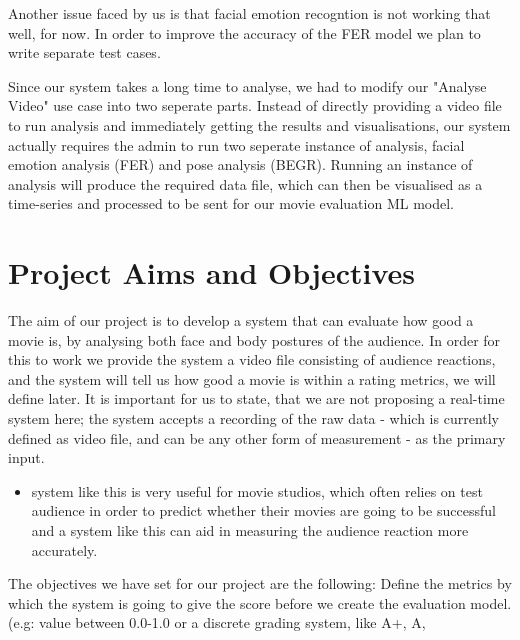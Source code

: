 \documentclass[12pt,a4paper,man]{report}
\begin{document}
Another issue faced by us is that facial emotion recogntion is not working that well, for now. In order to improve the accuracy of the \gls{FER} model we plan to write separate test cases.

Since our system takes a long time to analyse, we had to modify our "Analyse Video" use case into two seperate parts. Instead of directly providing a video file to run analysis and immediately getting the results and visualisations, our system actually requires the admin to run two seperate instance of analysis, facial emotion analysis (FER) and pose analysis (BEGR). Running an instance of analysis will produce the required data file, which can then be visualised as a time-series and processed to be sent for our movie evaluation ML model.


\chapter{Project Aims and Objectives}
\label{sec:org922e328}
The aim of our project is to develop a system that can evaluate how good a movie is, by analysing both face and body postures of the audience. In order for this to work we provide the system a video file consisting of audience reactions, and the system will tell us how good a movie is within a rating metrics, we will define later. It is important for us to state, that we are not proposing a real-time system here; the system accepts a recording of the raw data - which is currently defined as video file, and can be any other form of measurement - as the primary input.
\begin{itemize}
\item system like this is very useful for movie studios, which often relies on test audience in order to predict whether their movies are going to be successful and a system like this can aid in measuring the audience reaction more accurately.
\end{itemize}
The objectives we have set for our project are the following:
Define the metrics by which the system is going to give the score before we create the evaluation model. (e.g: value between 0.0-1.0 or a discrete grading system, like A+, A,  
\end{document}
